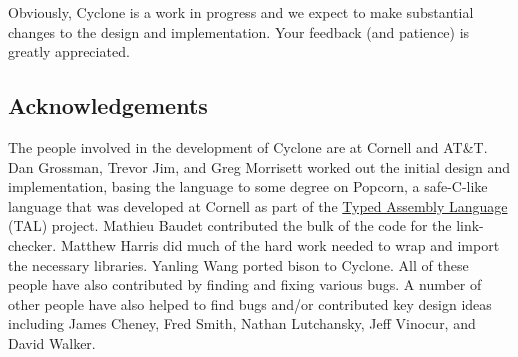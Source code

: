 Obviously, Cyclone is a work in progress and we expect to make
substantial changes to the design and implementation.  Your feedback
(and patience) is greatly appreciated.

\subsection{Acknowledgements}

The people involved in the development of Cyclone are at Cornell and
AT\&T\@.  Dan Grossman, Trevor Jim, and Greg Morrisett worked out the
initial design and implementation, basing the language to some degree
on Popcorn, a safe-C-like language that was developed at Cornell as
part of the
\href{http://www.cs.cornell.edu/talc}{Typed Assembly Language} (TAL)
project.  Mathieu Baudet contributed the bulk of the code for the
link-checker.  Matthew Harris did much of the hard work needed to
wrap and import the necessary libraries.  Yanling Wang ported bison
to Cyclone.  All of these people have also contributed by finding
and fixing various bugs.  A number of other people have also helped
to find bugs and/or contributed key design ideas including James Cheney, 
Fred Smith, Nathan Lutchansky, Jeff Vinocur, and David Walker.  

